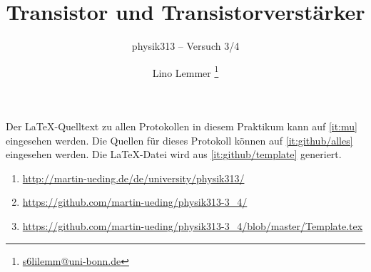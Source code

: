 


\usepackage{placeins}



\subject{Praktikumsprotokoll}
\title{Transistor und Transistorverstärker}
\subtitle{physik313 – Versuch 3/4}
\author{
	Lino Lemmer \footnote{\href{mailto:s6lilemm@uni-bonn.de}{s6lilemm@uni-bonn.de}}
}


\newcommand\IB{I_\text{B}}
\newcommand\IC{I_\text{C}}
\newcommand\ID{I_\text{D}}
\newcommand\IE{I_\text{E}}
\newcommand\IS{I_\text{S}}
\newcommand\RC{R_\text{C}}
\newcommand\RE{R_\text{E}}
\newcommand\UBE{U_\text{BE}}
\newcommand\UB{U_\text{B}}
\newcommand\UCE{U_\text{CE}}
\newcommand\UE{U_\text{E}}
\newcommand\UGS{U_\text{GS}}

\usepackage{tocloft}


\newcommand{\FIXME}[1]{\printTODO{FIXME: #1}}
\newcommand{\TODO}[1]{\printTODO{TODO: #1}}
\newcommand{\XXX}[1]{\printTODO{XXX: #1}}
\newcommand{\FRAGE}[1]{\printTODO{Rückfrage: #1}}

\newcommand{\printTODO}[1]{
	\par%
	\textcolor{OrangeRed}{\textsf{#1}}%
	\par%
	\refstepcounter{todo}
	\addcontentsline{lotd}{todo}{#1}
}




\maketitle

Der \LaTeX-Quelltext zu allen Protokollen in diesem Praktikum kann auf
\ref{it:mu} eingesehen werden. Die Quellen für dieses Protokoll können auf
\ref{it:github/alles} eingesehen werden. Die \LaTeX-Datei wird aus
\ref{it:github/template} generiert.

\begin{enumerate}
	\item
		\label{it:mu}
		\url{http://martin-ueding.de/de/university/physik313/}
	\item
		\label{it:github/alles}
		\url{https://github.com/martin-ueding/physik313-3_4/}
	\item
		\label{it:github/template}
		\url{https://github.com/martin-ueding/physik313-3_4/blob/master/Template.tex}
\end{enumerate}

